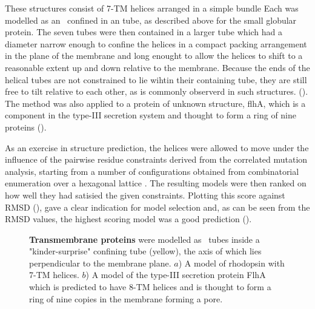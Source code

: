 These structures consist of 7-TM helices arranged in a simple bundle
Each was modelled as an \AH\ confined in an tube, as described above for the
small globular protein.   The seven tubes were then contained in a larger
tube which had a diameter narrow enough to confine the helices in a compact
packing arrangement in the plane of the membrane and long enought to allow 
the helices to shift to a reasonable extent up and down relative to the membrane.  
Because the ends of the helical tubes are not constrained to lie wihtin their
containing tube, they are still free to tilt relative to each other, as is
commonly observerd in such structures.  ().
The method was also applied to a protein of unknown structure, flhA, which is
a component in the type-III secretion system and thought to form a ring
of nine proteins ().

As an exercise in structure prediction, the helices were allowed to move
under the influence of the pairwise residue constraints derived from the
correlated mutation analysis, starting from a number of configurations
obtained from combinatorial enumeration over a hexagonal lattice \cite{TaylorWRet94a}.
The resulting models were then ranked on how well they had satisied the
given constraints.  Plotting this score against RMSD (),
gave a clear indication for model selection and, as can be seen from the
RMSD values, the highest scoring model was a good prediction ().

\begin{figure}
\centering
{}
\caption{
\label{Fig:TMmodels}
{\bf Transmembrane proteins} were modelled as \AH\ tubes inside a "kinder-surprise"
confining tube (yellow), the axis of which lies perpendicular to the membrane plane.
$a$) A model of rhodopsin with 7-TM helices.
$b$) A model of the type-III secretion protein FlhA which is predicted to have 8-TM helices
and is thought to form a ring of nine copies in the membrane forming a pore.
}
\end{figure}

